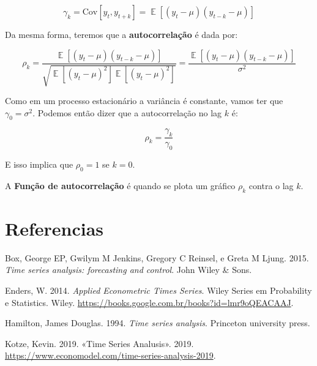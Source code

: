 \documentclass[
  letterpaper,
  DIV=11,
  numbers=noendperiod]{scrreprt}
\newlength{\cslhangindent}
\newenvironment{CSLReferences}[2] %
 {\begin{list}{}{%
  \setlength{\itemindent}{0pt}
  \setlength{\leftmargin}{0pt}
  \setlength{\parsep}{0pt}
  \ifodd #1
   \setlength{\leftmargin}{\cslhangindent}
   \setlength{\itemindent}{-1\cslhangindent}
  \fi
  \setlength{\itemsep}{#2\baselineskip}}}
 {\end{list}}
\DeclareMathOperator{\EX}{\mathbb{E}}
\theoremstyle{definition}
\theoremstyle{plain}
\theoremstyle{remark}
\begin{document}
\[
\gamma_{k} = \text{Cov}[y_{t},y_{t+k}] = \EX [ (y_{t} - \mu)(y_{t-k} - \mu)]
\]

Da mesma forma, teremos que a \textbf{autocorrelação} é dada por:

\[
\rho_{k} = \dfrac{\EX [ (y_{t} - \mu)(y_{t-k} - \mu)]}{\sqrt{\EX[(y_{t} - \mu)^{2}] \EX[(y_{t} - \mu)^{2}] }} = \dfrac{\EX [ (y_{t} - \mu)(y_{t-k} - \mu)]}{\sigma^{2}}
\]

Como em um processo estacionário a variância é constante, vamos ter que
\(\gamma_{0} = \sigma^{2}\). Podemos então dizer que a autocorrelação no
lag \(k\) é:

\[
\rho_{k} = \dfrac{\gamma_{k}}{\gamma_{0}}
\]

E isso implica que \(\rho_{0} = 1\) se \(k=0\).

A \textbf{Função de autocorrelação} é quando se plota um gráfico
\(\rho_{k}\) contra o lag \(k\).


\chapter*{Referencias}\label{referencias}


\label{refs}
\begin{CSLReferences}{1}{0}
Box, George EP, Gwilym M Jenkins, Gregory C Reinsel, e Greta M Ljung.
2015. \emph{Time series analysis: forecasting and control}. John Wiley
\& Sons.

Enders, W. 2014. \emph{Applied Econometric Times Series}. Wiley Series
em Probability e Statistics. Wiley.
\url{https://books.google.com.br/books?id=lmr9oQEACAAJ}.

Hamilton, James Douglas. 1994. \emph{Time series analysis}. Princeton
university press.

Kotze, Kevin. 2019. {«Time Series Analusis»}. 2019.
\url{https://www.economodel.com/time-series-analysis-2019}.

\end{CSLReferences}
\end{document}
